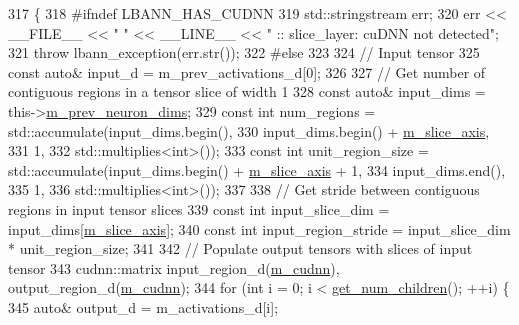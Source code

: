 \begin{DoxyCode}
317                         \{
318 \textcolor{preprocessor}{  #ifndef LBANN\_HAS\_CUDNN}
319     std::stringstream err;
320     err << \_\_FILE\_\_ << \textcolor{stringliteral}{" "} << \_\_LINE\_\_ << \textcolor{stringliteral}{" :: slice\_layer: cuDNN not detected"};
321     \textcolor{keywordflow}{throw} lbann\_exception(err.str());
322 \textcolor{preprocessor}{  #else}
323 
324     \textcolor{comment}{// Input tensor}
325     \textcolor{keyword}{const} \textcolor{keyword}{auto}& input\_d = m\_prev\_activations\_d[0];
326 
327     \textcolor{comment}{// Get number of contiguous regions in a tensor slice of width 1}
328     \textcolor{keyword}{const} \textcolor{keyword}{auto}& input\_dims = this->\hyperlink{classlbann_1_1Layer_ae204d1a2a79606eaa117273857ff62a3}{m\_prev\_neuron\_dims};
329     \textcolor{keyword}{const} \textcolor{keywordtype}{int} num\_regions = std::accumulate(input\_dims.begin(),
330                                             input\_dims.begin() + \hyperlink{classlbann_1_1slice__layer_a349dcd71f67d77d40247da24e4641ea2}{m\_slice\_axis},
331                                             1,
332                                             std::multiplies<int>());
333     \textcolor{keyword}{const} \textcolor{keywordtype}{int} unit\_region\_size = std::accumulate(input\_dims.begin() + 
      \hyperlink{classlbann_1_1slice__layer_a349dcd71f67d77d40247da24e4641ea2}{m\_slice\_axis} + 1,
334                                                  input\_dims.end(),
335                                             1,
336                                             std::multiplies<int>());
337 
338     \textcolor{comment}{// Get stride between contiguous regions in input tensor slices}
339     \textcolor{keyword}{const} \textcolor{keywordtype}{int} input\_slice\_dim = input\_dims[\hyperlink{classlbann_1_1slice__layer_a349dcd71f67d77d40247da24e4641ea2}{m\_slice\_axis}];
340     \textcolor{keyword}{const} \textcolor{keywordtype}{int} input\_region\_stride = input\_slice\_dim * unit\_region\_size;
341     
342     \textcolor{comment}{// Populate output tensors with slices of input tensor}
343     cudnn::matrix input\_region\_d(\hyperlink{classlbann_1_1Layer_a08dbb94239e3b8c96329786c57c72e21}{m\_cudnn}), output\_region\_d(\hyperlink{classlbann_1_1Layer_a08dbb94239e3b8c96329786c57c72e21}{m\_cudnn});
344     \textcolor{keywordflow}{for} (\textcolor{keywordtype}{int} i = 0; i < \hyperlink{classlbann_1_1Layer_a1409a117c31a7ea4f2c7a4d22a3e86c3}{get\_num\_children}(); ++i) \{
345       \textcolor{keyword}{auto}& output\_d = m\_activations\_d[i];

\end{DoxyCode}
